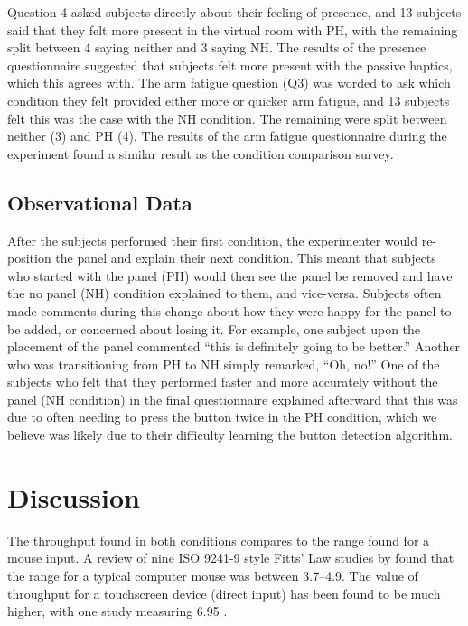 Question 4 asked subjects directly about their feeling of presence, and 13 subjects said that they felt more present in the virtual room with PH, with the remaining split between 4 saying neither and 3 saying NH.
The results of the presence questionnaire suggested that subjects felt more present with the passive haptics, which this agrees with.
The arm fatigue question (Q3) was worded to ask which condition they felt provided either more or quicker arm fatigue, and 13 subjects felt this was the case with the NH condition.
The remaining were split between neither (3) and PH (4).
The results of the arm fatigue questionnaire during the experiment found a similar result as the condition comparison survey.

\subsection{Observational Data}

After the subjects performed their first condition, the experimenter would re-position the panel and explain their next condition.
This meant that subjects who started with the panel (PH) would then see the panel be removed and have the no panel (NH) condition explained to them, and vice-versa.
Subjects often made comments during this change about how they were happy for the panel to be added, or concerned about losing it.
For example, one subject upon the placement of the panel commented ``this is definitely going to be better.''
Another who was transitioning from PH to NH simply remarked, ``Oh, no!''
One of the subjects who felt that they performed faster and more accurately without the panel (NH condition) in the final questionnaire explained afterward that this was due to often needing to press the button twice in the PH condition, which we believe was likely due to their difficulty learning the button detection algorithm.

\section{Discussion}

The throughput found in both conditions compares to the range found for a mouse input.
A review of nine ISO 9241-9 style Fitts' Law studies by \citet{soukoreff_towards_2004} found that the range for a typical computer mouse was between \SIrange[range-phrase = {~and~}]{3.7}{4.9}{\bps}.
The value of throughput for a touchscreen device (direct input) has been found to be much higher, with one study measuring \SI{6.95}{\bps} \citep{mackenzie_fitts_2015}.


